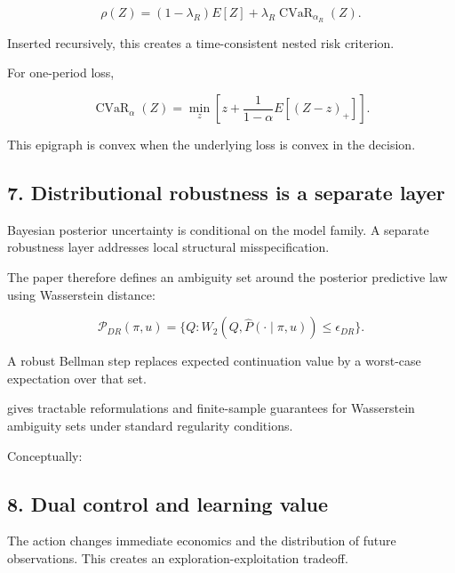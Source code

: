 \[
\rho(Z)=(1-\lambda_R)E[Z]+\lambda_R\operatorname{CVaR}_{\alpha_R}(Z).
\]

Inserted recursively, this creates a time-consistent nested risk criterion.

For one-period loss,

\[
\operatorname{CVaR}_\alpha(Z)
=\min_z\left[z+\frac{1}{1-\alpha}E[(Z-z)_+]\right].
\]

This epigraph is convex when the underlying loss is convex in the decision.

\subsection{7. Distributional robustness is a separate layer}\label{distributional-robustness-is-a-separate-layer}

Bayesian posterior uncertainty is conditional on the model family. A separate
robustness layer addresses local structural misspecification.

The paper therefore defines an ambiguity set around the posterior predictive law
using Wasserstein distance:

\[
\mathcal P_{DR}(\pi,u)=\{Q:W_2(Q,\widehat P(\cdot\mid\pi,u))\le\epsilon_{DR}\}.
\]

A robust Bellman step replaces expected continuation value by a worst-case
expectation over that set.

\citet{esfahani2018dro} gives tractable reformulations and finite-sample
guarantees for Wasserstein ambiguity sets under standard regularity conditions.

Conceptually:

\begin{Shaded}
\begin{Highlighting}[]
\end{Highlighting}
\end{Shaded}

\subsection{8. Dual control and learning value}\label{dual-control-and-learning-value}

The action changes immediate economics and the distribution of future
observations. This creates an exploration-exploitation tradeoff.

